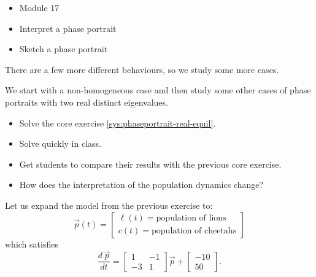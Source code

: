 \bookonlynewpage

\begin{lesson}

	\begin{itemize}
		\item Module 17
	\end{itemize}

	\begin{itemize}
		\item Interpret a phase portrait
		\item Sketch a phase portrait
	\end{itemize}
	

There are a few more different behaviours, so we study some more cases. 

We start with a non-homogeneous case and then study some other cases of phase portraits with two real distinct eigenvalues.

\begin{itemize}
	\item Solve the core exercise \ref{sys:phaseportrait-real-equil}.
\end{itemize}

\end{lesson}

\begin{annotation}
	\begin{goals}
		\begin{itemize}
			\item Solve quickly in class.
			\item Get students to compare their results with the previous core exercise.
			\item How does the interpretation of the population dynamics change?
		\end{itemize}
	\end{goals}
\end{annotation}
\question \label{sys:phaseportrait-real-equil}
	Let us expand the model from the previous exercise to:
	$$ \vec{p}(t) = \begin{bmatrix} \ell(t) = \text{population of lions} \\ c(t) = \text{population of cheetahs} \end{bmatrix} $$
	which satisfies
	$$
	\frac{d\,\vec{p}}{dt} = \begin{bmatrix}
 		1 & -1 \\
 		-3 & 1
 	\end{bmatrix} \vec{p}
 	+ \begin{bmatrix}
 		- 10 \\ 50
	 \end{bmatrix}.
	$$
	
